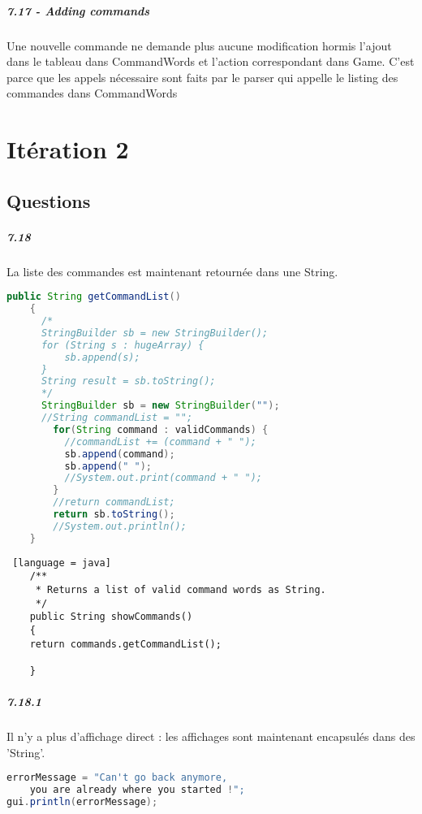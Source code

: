 \documentclass[11pt,a4paper]{report}
\begin{document}
\paragraph{7.17 - Adding commands}
Une nouvelle commande ne demande plus aucune modification hormis l'ajout dans le tableau dans CommandWords et l'action correspondant dans Game. C'est parce que les appels nécessaire sont faits par le parser qui appelle le listing des commandes dans CommandWords

\chapter{Itération 2}
\section{Questions}
\paragraph{7.18}
La liste des commandes est maintenant retournée dans une String.
\begin{lstlisting}[language = java]
public String getCommandList()
    {
      /*
      StringBuilder sb = new StringBuilder();
      for (String s : hugeArray) {
          sb.append(s);
      }
      String result = sb.toString();
      */
      StringBuilder sb = new StringBuilder("");
      //String commandList = "";
        for(String command : validCommands) {
          //commandList += (command + " ");
          sb.append(command);
          sb.append(" ");
          //System.out.print(command + " ");
        }
        //return commandList;
        return sb.toString();
        //System.out.println();
    }
\end{lstlisting}

\begin{lstlisting} [language = java]
    /**
     * Returns a list of valid command words as String.
     */
    public String showCommands()
    {
    return commands.getCommandList();

    }
\end{lstlisting}

\paragraph{7.18.1}
Il n'y a plus d'affichage direct : les affichages sont maintenant encapsulés dans des 'String'.
\begin{lstlisting}[language = java]
errorMessage = "Can't go back anymore,
	you are already where you started !";
gui.println(errorMessage);
\end{lstlisting}
\end{document}
